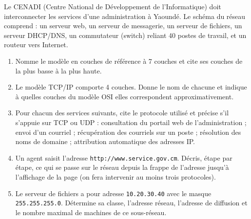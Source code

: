 \documentclass[11pt]{article}
\newcounter{popsec}
\newcounter{popsub}
\newcommand{\courssub}[1]{%
  \stepcounter{popsub}%
  \par\vspace{9pt}\noindent{\popxbold\fontsize{11.5}{13}\selectfont\color{popink}{\color{poporange}\thepopsec.\thepopsub}\hspace{6pt}#1}\par\nopagebreak\vspace{4pt}
}
\begin{document}
\courssub{Je me prépare au Bac}

\begin{exercice}
Le CENADI (Centre National de Développement de l'Informatique) doit interconnecter les services d'une administration à Yaoundé. Le schéma du réseau comprend : un serveur web, un serveur de messagerie, un serveur de fichiers, un serveur DHCP/DNS, un commutateur (switch) reliant 40 postes de travail, et un routeur vers Internet.
\begin{enumerate}
\item Nomme le modèle en couches de référence à 7 couches et cite ses couches de la plus basse à la plus haute.
\item Le modèle TCP/IP comporte 4 couches. Donne le nom de chacune et indique à quelles couches du modèle OSI elles correspondent approximativement.
\item Pour chacun des services suivants, cite le protocole utilisé et précise s'il s'appuie sur TCP ou UDP : consultation du portail web de l'administration ; envoi d'un courriel ; récupération des courriels sur un poste ; résolution des noms de domaine ; attribution automatique des adresses IP.
\item Un agent saisit l'adresse \texttt{http://www.service.gov.cm}. Décris, étape par étape, ce qui se passe sur le réseau depuis la frappe de l'adresse jusqu'à l'affichage de la page (on fera intervenir au moins trois protocoles).
\item Le serveur de fichiers a pour adresse \texttt{10.20.30.40} avec le masque \texttt{255.255.255.0}. Détermine sa classe, l'adresse réseau, l'adresse de diffusion et le nombre maximal de machines de ce sous-réseau.
\end{enumerate}
\end{exercice}
\end{document}
